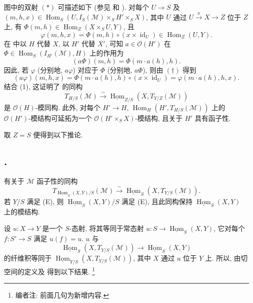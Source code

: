 图中的双射 \((*)\) 可描述如下
(参见  和
).
对每个 \(U\to S\) 及
\((m,h,x)\in\operatorname{Hom}_S
  (U,I_S(\mathcal M)\times_SH'\times_SX)\),
其中 \(U\) 通过 \(U\xrightarrow{x}X\to Z\) 位于 \(Z\) 上,
有 \(\Phi(m,h)\in\operatorname{Hom}_Z(X\times_SU,Y)\), 且
\begin{equation}
  \varphi(m,h,x)=\Phi(m,h)\circ(x\times\operatorname{id}_U)
  \in\operatorname{Hom}_Z(U,Y).
  \tag{$\dagger$}\label{sga3:ii:subsection:3-9-0:equation:dagger}
\end{equation}
在  中以 \(H\) 代替
\(X\), 以 \(H'\) 代替 \(X'\), 可知
\(a\in\mathcal O(H')\) 在
\(\Phi\in\operatorname{Hom}_S(I_{H'}(\mathcal M),H)\) 上的作用为
\[
  (a\Phi)(m,h)=\Phi(m\cdot a(h),h).
\]
因此, 若 \(\varphi\) (分别地, \(a\varphi\)) 对应于
\(\Phi\) (分别地, \(a\Phi\)), 则由 \((\dagger)\) 得到
\begin{equation}
  (a\varphi)(m,h,x)
  =\Phi(m\cdot a(h),h)\circ(x\times\operatorname{id}_U)
  =\varphi(m\cdot a(h),h,x).
  \tag{2}\label{sga3:ii:subsection:3-9-0:equation:2}
\end{equation}
结合 (1), 这证明了  的同构
\[
  T_{H/S}(\mathcal M)
  \xrightarrow{\sim}
  \underline{\operatorname{Hom}}_{Z/S}
    (X,T_{Y/Z}(\mathcal M))
\]
是 \(\mathcal O(H)\)-模同构.
此外, 对每个 \(H'\to H\),
\(\operatorname{Hom}_H(H',T_{H/S}(\mathcal M))\) 上的
\(\mathcal O(H')\)-模结构可延拓为一个
\(\mathcal O(H'\times_SX)\)-模结构, 且关于 \(H'\) 具有函子性.

取 \(Z=S\) 便得到以下推论.

\subsection*{.}
有关于 \(\mathcal M\) 函子性的同构
\[
  T_{\underline{\operatorname{Hom}}_S(X,Y)/S}(\mathcal M)
  \xrightarrow{\sim}
  \underline{\operatorname{Hom}}_S(X,T_{Y/S}(\mathcal M)).
\]
若 \(Y/S\) 满足 (E), 则
\(\underline{\operatorname{Hom}}_S(X,Y)/S\) 满足 (E),
且此同构保持 \(\underline{\operatorname{Hom}}_S(X,Y)\) 上的模结构.

设 \(u:X\to Y\) 是一个 \(S\)-态射,
将其等同于常态射 \(u:S\to\underline{\operatorname{Hom}}_S(X,Y)\),
它对每个 \(f:S'\to S\) 满足 \(u(f)=u\).
\(u\) 与
\[
  \underline{\operatorname{Hom}}_S(X,T_{Y/S}(\mathcal M))
  \longrightarrow\underline{\operatorname{Hom}}_S(X,Y)
\]
的纤维积等同于
\(\underline{\operatorname{Hom}}_{Y/S}(X,T_{Y/S}(\mathcal M))\),
其中 \(X\) 通过 \(u\) 位于 \(Y\) 上.
所以, 由切空间的定义及
得到以下结果.
\footnote{编者注: 前面几句为新增内容.}

